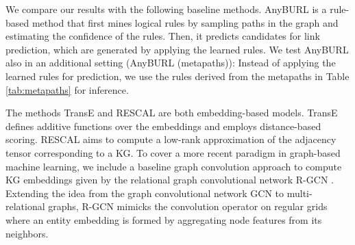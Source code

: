 \documentclass{article}
\begin{document}
We compare our results with the following baseline methods. AnyBURL \cite{meilicke2019anytime} is a rule-based method that first mines logical rules by sampling paths in the graph and estimating the confidence of the rules. Then, it predicts candidates for link prediction, which are generated by applying the learned rules. %
We test AnyBURL also in an additional setting (AnyBURL (metapaths)): Instead of applying the learned rules for prediction, we use the rules derived from the metapaths in Table \ref{tab:metapaths} for inference.

The methods TransE \cite{bordes2013translating} and RESCAL \cite{nickel2011three} are both embedding-based models. TransE defines additive functions over the embeddings and employs distance-based scoring. RESCAL aims to compute a low-rank approximation of the adjacency tensor corresponding to a KG.
To cover a more recent paradigm in graph-based machine learning, we include a baseline graph convolution approach to compute KG embeddings given by the relational graph convolutional network R-GCN \cite{schlichtkrull2018modeling}. Extending the idea from the graph convolutional network GCN \cite{kipf2016semi} to multi-relational graphs, R-GCN mimicks the convolution operator on regular grids where an entity embedding is formed by aggregating node features from its neighbors. %



\fi
\end{document}
